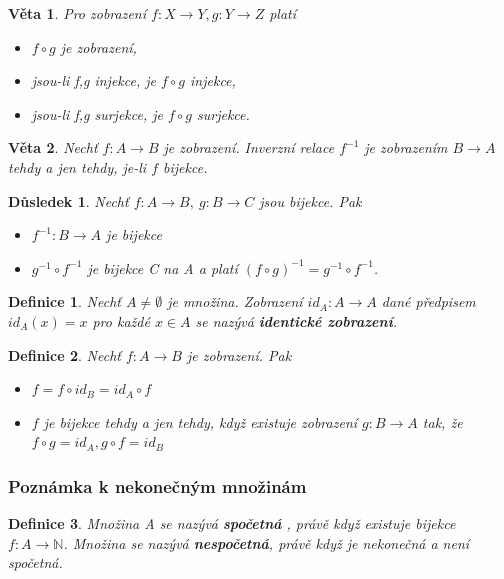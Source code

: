 \documentclass[12pt,a4paper]{article}
\newtheorem{definition}{Definice}
\newtheorem{sentence}{Věta}
\newtheorem{result}{Důsledek}
\begin{document}
\begin{sentence}
	Pro zobrazení $f : X \rightarrow Y, g : Y \rightarrow Z$ platí
	\begin{itemize}
		\item[a)] $f \circ g$ je zobrazení,
		\item[b)] jsou-li f,g injekce, je $f \circ g$ injekce,
		\item[c)] jsou-li f,g surjekce, je $f \circ g$ surjekce.
	\end{itemize}
\end{sentence}

\begin{sentence}
	Nechť $f: A \rightarrow B$ je zobrazení. Inverzní relace $f^{-1}$ je zobrazením $B \rightarrow A$ tehdy a jen tehdy, je-li $f$ bijekce.
\end{sentence}

\begin{result}
	Nechť $f: A \rightarrow B, \ g: B \rightarrow C$ jsou bijekce. Pak
	\begin{itemize}
		\item[a)] $f^{-1} : B \rightarrow A$ je bijekce
		\item[b)] $g^{-1} \circ f^{-1}$ je bijekce C na A a platí $(f \circ g)^{-1} = g^{-1} \circ f^{-1}$.
	\end{itemize}
\end{result}

\begin{definition}
	Nechť $A \not= \emptyset$ je množina. Zobrazení $id_A : A \rightarrow A$ dané předpisem $id_A(x) = x$ pro každé $x \in A$ se nazývá \textbf{identické zobrazení}.
\end{definition}

\begin{definition}
	Nechť $f : A \rightarrow B$ je zobrazení. Pak
	\begin{itemize}
		\item[a)] $f = f \circ id_B = id_A \circ f$
		\item[b)] $f$ je bijekce tehdy a jen tehdy, když existuje zobrazení $g : B \rightarrow A$ tak, že $f \circ g = id_A, g \circ f = id_B$
	\end{itemize}
\end{definition}


\subsubsection{Poznámka k nekonečným množinám}
\begin{definition}
	Množina A se nazývá \textbf{spočetná} , právě když existuje bijekce $f : A \rightarrow \mathbb{N}$. Množina se nazývá \textbf{nespočetná}, právě když je nekonečná a není spočetná.
\end{definition}
\end{document}
